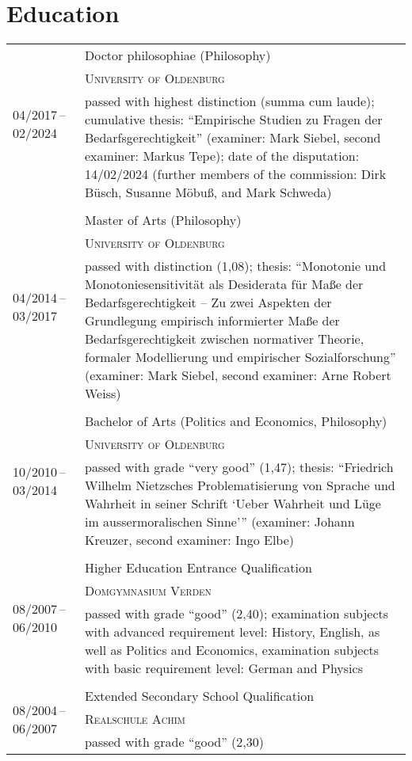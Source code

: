 \documentclass[a4paper,10pt]{article}
\begin{document}
\section{Education}
\begin{longtable}{p{2.5cm}p{11cm}}
\multirow{3}{2.5cm}{\footnotesize{04/2017\,--\,02/2024}} & Doctor philosophiae (Philosophy)\\
& \textsc{University of Oldenburg}\\
& \footnotesize{passed with highest distinction (summa cum laude); cumulative thesis: \enquote{Empirische Studien zu Fragen der Bedarfsgerechtigkeit} (examiner: Mark Siebel, second examiner: Markus Tepe); date of the disputation: 14/02/2024 (further members of the commission: Dirk Büsch, Susanne Möbuß, and Mark Schweda)}\\
\\
\multirow{3}{2.5cm}{\footnotesize{04/2014\,--\,03/2017}} & Master of Arts (Philosophy)\\
& \textsc{University of Oldenburg}\\
& \footnotesize{passed with distinction (1,08); thesis: \enquote{Monotonie und Monotoniesensitivität als Desiderata für Maße der Bedarfsgerechtigkeit -- Zu zwei Aspekten der Grundlegung empirisch informierter Maße der Bedarfsgerechtigkeit zwischen normativer Theorie, formaler Modellierung und empirischer Sozialforschung} (examiner: Mark Siebel, second examiner: Arne Robert Weiss)}\\
\\
\multirow{3}{2.5cm}{\footnotesize{10/2010\,--\,03/2014}} & Bachelor of Arts (Politics and Economics, Philosophy)\\
& \textsc{University of Oldenburg}\\
& \footnotesize{passed with grade \enquote{very good} (1,47); thesis: \enquote{Friedrich Wilhelm Nietzsches Problematisierung von Sprache und Wahrheit in seiner Schrift \enquote{Ueber Wahrheit und Lüge im aussermoralischen Sinne}} (examiner: Johann Kreuzer, second examiner: Ingo Elbe)}\\
\\
\multirow{3}{2.5cm}{\footnotesize{08/2007\,--\,06/2010}} & Higher Education Entrance Qualification\\
& \textsc{Domgymnasium Verden}\\
& \footnotesize{passed with grade \enquote{good} (2,40); examination subjects with advanced requirement level: History, English, as well as Politics and Economics, examination subjects with basic requirement level: German and Physics}\\
\\
\multirow{3}{2.5cm}{\footnotesize{08/2004\,--\,06/2007}} & Extended Secondary School Qualification\\
& \textsc{Realschule Achim}\\
& \footnotesize{passed with grade \enquote{good} (2,30)}\\
\end{longtable}
\end{document}
